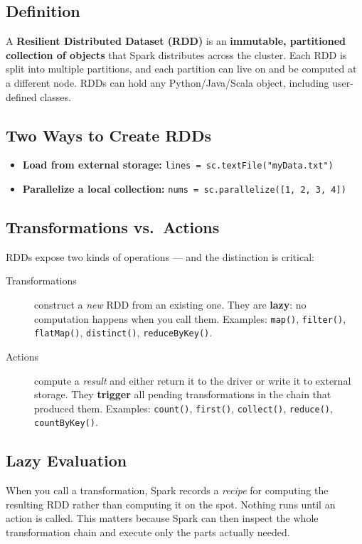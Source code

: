\documentclass[11pt]{article}
\begin{document}
\subsection{Definition}
A \textbf{Resilient Distributed Dataset (RDD)} is an \textbf{immutable, partitioned collection of objects} that Spark distributes across the cluster. Each RDD is split into multiple partitions, and each partition can live on and be computed at a different node. RDDs can hold any Python/Java/Scala object, including user-defined classes.

\subsection{Two Ways to Create RDDs}
\begin{itemize}
    \item \textbf{Load from external storage:} \texttt{lines = sc.textFile("myData.txt")}
    \item \textbf{Parallelize a local collection:} \texttt{nums = sc.parallelize([1, 2, 3, 4])}
\end{itemize}

\subsection{Transformations vs.\ Actions}
RDDs expose two kinds of operations --- and the distinction is critical:

\begin{description}
    \item[Transformations] construct a \emph{new} RDD from an existing one. They are \textbf{lazy}: no computation happens when you call them. Examples: \texttt{map()}, \texttt{filter()}, \texttt{flatMap()}, \texttt{distinct()}, \texttt{reduceByKey()}.
    \item[Actions] compute a \emph{result} and either return it to the driver or write it to external storage. They \textbf{trigger} all pending transformations in the chain that produced them. Examples: \texttt{count()}, \texttt{first()}, \texttt{collect()}, \texttt{reduce()}, \texttt{countByKey()}.
\end{description}

\subsection{Lazy Evaluation}
When you call a transformation, Spark records a \emph{recipe} for computing the resulting RDD rather than computing it on the spot. Nothing runs until an action is called. This matters because Spark can then inspect the whole transformation chain and execute only the parts actually needed.
\end{document}
